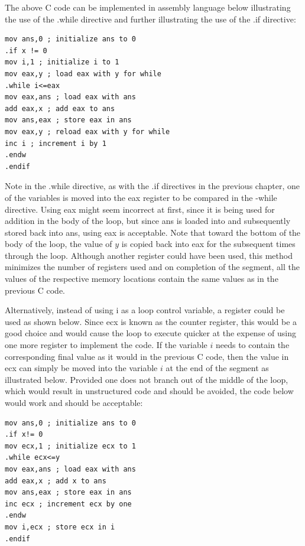 \documentclass[10pt]{book}
\begin{document}
The above C code can be implemented in assembly language below illustrating the use of the .while directive and further illustrating the use of the .if directive:

\begin{verbatim}
mov ans,0 ; initialize ans to 0
.if x != 0
mov i,1 ; initialize i to 1
mov eax,y ; load eax with y for while
.while i<=eax
mov eax,ans ; load eax with ans
add eax,x ; add eax to ans
mov ans,eax ; store eax in ans
mov eax,y ; reload eax with y for while
inc i ; increment i by 1
.endw
.endif
\end{verbatim}

Note in the .while directive, as with the .if directives in the previous chapter, one of the variables is moved into the eax register to be compared in the -while directive. Using eax might seem incorrect at first, since it is being used for addition in the body of the loop, but since ans is loaded into and subsequently stored back into ans, using eax is acceptable. Note that toward the bottom of the body of the loop, the value of $y$ is copied back into eax for the subsequent times through the loop. Although another register could have been used, this method minimizes the number of registers used and on completion of the segment, all the\\
values of the respective memory locations contain the same values as in the previous C code.


Alternatively, instead of using i as a loop control variable, a register could be used as shown below. Since ecx is known as the counter register, this would be a good choice and would cause the loop to execute quicker at the expense of using one more register to implement the code. If the variable $i$ needs to contain the corresponding final value as it would in the previous C code, then the value in ecx can simply be moved into the variable $i$ at the end of the segment as illustrated below. Provided one does not branch out of the middle of the loop, which would result in unstructured code and should be avoided, the code below would work and should be acceptable:

\begin{verbatim}
mov ans,0 ; initialize ans to 0
.if x!= 0
mov ecx,1 ; initialize ecx to 1
.while ecx<=y
mov eax,ans ; load eax with ans
add eax,x ; add x to ans
mov ans,eax ; store eax in ans
inc ecx ; increment ecx by one
.endw
mov i,ecx ; store ecx in i
.endif
\end{verbatim}
\end{document}
